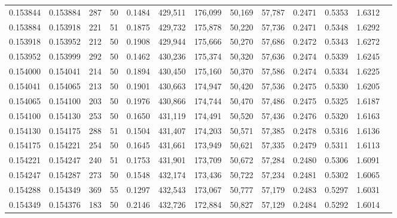\begin{tabular}{rrrrrrrrrrrrr}
0.153844 & 0.153884 &   287 &  50 &                                     0.1484 & 429,511 & 176,099 &  50,169 &  57,787 & 0.2471 & 0.5353 & 1.6312 \\
0.153884 & 0.153918 &   221 &  51 &                                     0.1875 & 429,732 & 175,878 &  50,220 &  57,736 & 0.2471 & 0.5348 & 1.6292 \\
0.153918 & 0.153952 &   212 &  50 &                                     0.1908 & 429,944 & 175,666 &  50,270 &  57,686 & 0.2472 & 0.5343 & 1.6272 \\
0.153952 & 0.153999 &   292 &  50 &                                     0.1462 & 430,236 & 175,374 &  50,320 &  57,636 & 0.2474 & 0.5339 & 1.6245 \\
0.154000 & 0.154041 &   214 &  50 &                                     0.1894 & 430,450 & 175,160 &  50,370 &  57,586 & 0.2474 & 0.5334 & 1.6225 \\
0.154041 & 0.154065 &   213 &  50 &                                     0.1901 & 430,663 & 174,947 &  50,420 &  57,536 & 0.2475 & 0.5330 & 1.6205 \\
0.154065 & 0.154100 &   203 &  50 &                                     0.1976 & 430,866 & 174,744 &  50,470 &  57,486 & 0.2475 & 0.5325 & 1.6187 \\
0.154100 & 0.154130 &   253 &  50 &                                     0.1650 & 431,119 & 174,491 &  50,520 &  57,436 & 0.2476 & 0.5320 & 1.6163 \\
0.154130 & 0.154175 &   288 &  51 &                                     0.1504 & 431,407 & 174,203 &  50,571 &  57,385 & 0.2478 & 0.5316 & 1.6136 \\
0.154175 & 0.154221 &   254 &  50 &                                     0.1645 & 431,661 & 173,949 &  50,621 &  57,335 & 0.2479 & 0.5311 & 1.6113 \\
0.154221 & 0.154247 &   240 &  51 &                                     0.1753 & 431,901 & 173,709 &  50,672 &  57,284 & 0.2480 & 0.5306 & 1.6091 \\
0.154247 & 0.154287 &   273 &  50 &                                     0.1548 & 432,174 & 173,436 &  50,722 &  57,234 & 0.2481 & 0.5302 & 1.6065 \\
0.154288 & 0.154349 &   369 &  55 &                                     0.1297 & 432,543 & 173,067 &  50,777 &  57,179 & 0.2483 & 0.5297 & 1.6031 \\
0.154349 & 0.154376 &   183 &  50 &                                     0.2146 & 432,726 & 172,884 &  50,827 &  57,129 & 0.2484 & 0.5292 & 1.6014 \\

\end{tabular}

